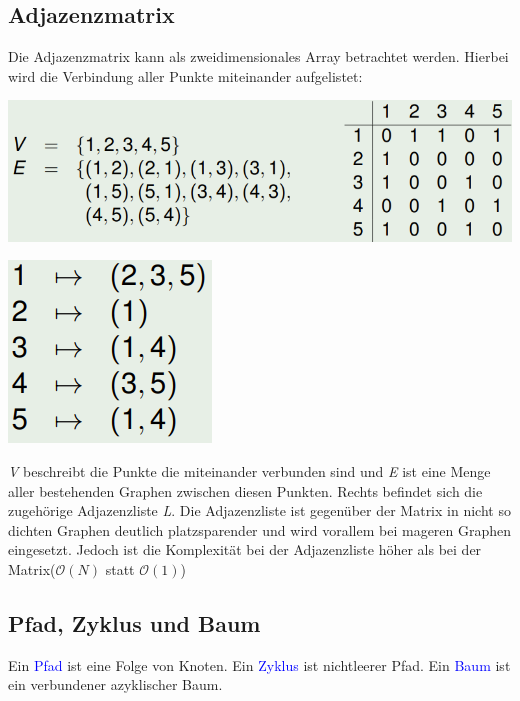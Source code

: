 \documentclass[12pt,a4paper]{article}
\begin{document}
\subsection{Adjazenzmatrix}
Die Adjazenzmatrix kann als zweidimensionales Array betrachtet werden. Hierbei wird die Verbindung aller Punkte miteinander aufgelistet:\newline
\newline
\begin{minipage}[c]{0.7\textwidth}
	\begin{center}
		\includegraphics[scale=.8]{Bilder/Adjazenzmatrix.PNG}
	\end{center}
\end{minipage}
\begin{minipage}[c]{0.3\textwidth}
	\begin{center}
		\includegraphics[scale=.95]{Bilder/Adjazenzliste.PNG}
	\end{center}
\end{minipage}\vspace{.5cm}
\textit{V} beschreibt die Punkte die miteinander verbunden sind und \textit{E} ist eine Menge aller bestehenden Graphen zwischen diesen Punkten. Rechts befindet sich die zugehörige Adjazenzliste \textit{L}.\newline
Die Adjazenzliste ist gegenüber der Matrix in nicht so dichten Graphen deutlich platzsparender und wird vorallem bei mageren Graphen eingesetzt. Jedoch ist die Komplexität bei der Adjazenzliste höher als bei der Matrix($\mathcal{O}(N)$ statt $\mathcal{O}(1)$)

\subsection{Pfad, Zyklus und Baum}
Ein \textcolor{blue}{Pfad} ist eine Folge von Knoten.\newline
Ein \textcolor{blue}{Zyklus} ist nichtleerer Pfad. \newline
Ein \textcolor{blue}{Baum} ist ein verbundener azyklischer Baum.
\end{document}

